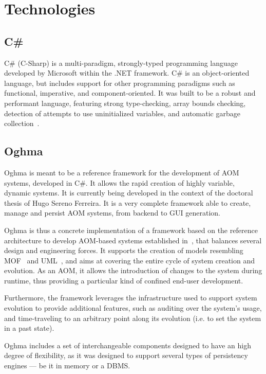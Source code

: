 \chapter{Technologies}\label{chap:technologies}

\section{C\#}\label{sec:csharp}

C\# (C-Sharp) is a multi-paradigm, strongly-typed programming language developed by Microsoft within the .NET framework. C\# is an object-oriented language, but includes support for other programming paradigms such as functional, imperative, and component-oriented. It was built to be a robust and performant language, featuring strong type-checking, array bounds checking, detection of attempts to use uninitialized variables, and automatic garbage collection~\cite{csharp}.

\section{Oghma}\label{sec:oghma}

Oghma is meant to be a reference framework for the development of AOM systems, developed in C\#. It allows the rapid creation of highly variable, dynamic systems. It is currently being developed in the context of the doctoral thesis of Hugo Sereno Ferreira. It is a very complete framework able to create, manage and persist AOM systems, from backend to GUI generation.

Oghma is thus a concrete implementation of a framework based on the reference architecture to develop AOM-based systems established in~\cite{ferreira_phd_2010}, that balances several design and engineering forces. It supports the creation of models resembling MOF~\cite{mof} and UML~\cite{uml}, and aims at covering the entire cycle of system creation and evolution. As an AOM, it allows the introduction of changes to the system during runtime, thus providing a particular kind of confined end-user development.

Furthermore, the framework leverages the infrastructure used to support system evolution to provide additional features, such as auditing over the system’s usage, and time-traveling to an arbitrary point along its evolution (i.e. to set the system in a past state).

Oghma includes a set of interchangeable components designed to have an high degree of flexibility, as it was designed to support several types of persistency engines --- be it in memory or a DBMS.

